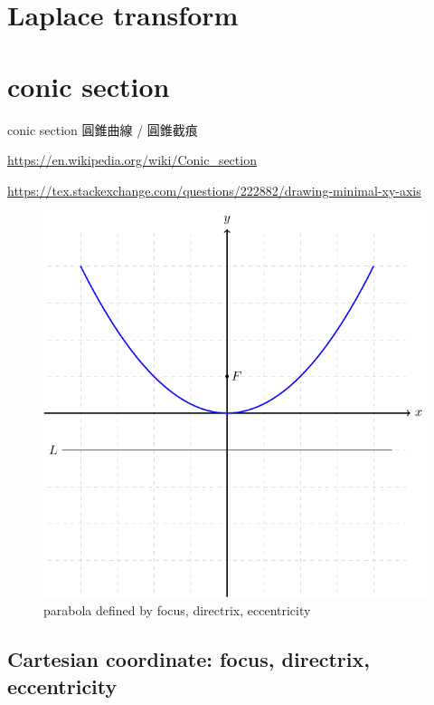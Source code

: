 \documentclass[
]{book}
\theoremstyle{definition}
\theoremstyle{definition}
\theoremstyle{definition}
\theoremstyle{definition}
\theoremstyle{remark}
\begin{document}
\hypertarget{laplace-transform}{%
\chapter{Laplace transform}\label{laplace-transform}}

\hypertarget{conic-section}{%
\chapter{conic section}\label{conic-section}}

\begin{CJK}{UTF8}{bsmi}
conic section 圓錐曲線 / 圓錐截痕
\end{CJK}

\url{https://en.wikipedia.org/wiki/Conic_section}

\url{https://tex.stackexchange.com/questions/222882/drawing-minimal-xy-axis}

\begin{figure}
\includegraphics[width=0.75\linewidth]{202402252333-conic-section_files/figure-latex/unnamed-chunk-1-1} \caption{parabola defined by focus, directrix, eccentricity}\label{fig:unnamed-chunk-1}
\end{figure}

\hypertarget{cartesian-coordinate-focus-directrix-eccentricity}{%
\section{Cartesian coordinate: focus, directrix, eccentricity}\label{cartesian-coordinate-focus-directrix-eccentricity}}
\end{document}
